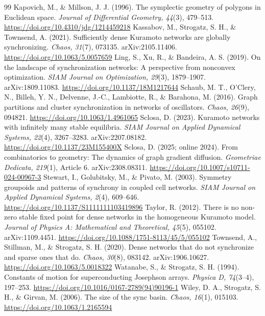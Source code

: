 \documentclass[11pt,a4paper]{article}
\theoremstyle{definition}\newtheorem{conjecture}{Conjecture}
\theoremstyle{remark}\newtheorem{remark}[theorem]{Remark}
\begin{document}
\begin{thebibliography}{99}
 Kapovich, M., \& Millson, J. J. (1996). The symplectic geometry of polygons in Euclidean space. \emph{Journal of Differential Geometry, 44}(3), 479--513. \url{https://doi.org/10.4310/jdg/1214459218}
 Kassabov, M., Strogatz, S. H., \& Townsend, A. (2021). Sufficiently dense Kuramoto networks are globally synchronizing. \emph{Chaos, 31}(7), 073135. arXiv:2105.11406. \url{https://doi.org/10.1063/5.0057659}
 Ling, S., Xu, R., \& Bandeira, A. S. (2019). On the landscape of synchronization networks: A perspective from nonconvex optimization. \emph{SIAM Journal on Optimization, 29}(3), 1879--1907. arXiv:1809.11083. \url{https://doi.org/10.1137/18M1217644}
 Schaub, M. T., O'Clery, N., Billeh, Y. N., Delvenne, J.-C., Lambiotte, R., \& Barahona, M. (2016). Graph partitions and cluster synchronization in networks of oscillators. \emph{Chaos, 26}(9), 094821. \url{https://doi.org/10.1063/1.4961065}
 Sclosa, D. (2023). Kuramoto networks with infinitely many stable equilibria. \emph{SIAM Journal on Applied Dynamical Systems, 22}(4), 3267--3283. arXiv:2207.08182. \url{https://doi.org/10.1137/23M155400X}
 Sclosa, D. (2025; online 2024). From combinatorics to geometry: The dynamics of graph gradient diffusion. \emph{Geometriae Dedicata, 219}(1), Article 6. arXiv:2308.08311. \url{https://doi.org/10.1007/s10711-024-00967-3}
 Stewart, I., Golubitsky, M., \& Pivato, M. (2003). Symmetry groupoids and patterns of synchrony in coupled cell networks. \emph{SIAM Journal on Applied Dynamical Systems, 2}(4), 609--646. \url{https://doi.org/10.1137/S1111111103419896}
 Taylor, R. (2012). There is no non-zero stable fixed point for dense networks in the homogeneous Kuramoto model. \emph{Journal of Physics A: Mathematical and Theoretical, 45}(5), 055102. arXiv:1109.4451. \url{https://doi.org/10.1088/1751-8113/45/5/055102}
 Townsend, A., Stillman, M., \& Strogatz, S. H. (2020). Dense networks that do not synchronize and sparse ones that do. \emph{Chaos, 30}(8), 083142. arXiv:1906.10627. \url{https://doi.org/10.1063/5.0018322}
 Watanabe, S., \& Strogatz, S. H. (1994). Constants of motion for superconducting Josephson arrays. \emph{Physica D, 74}(3--4), 197--253. \url{https://doi.org/10.1016/0167-2789(94)90196-1}
 Wiley, D. A., Strogatz, S. H., \& Girvan, M. (2006). The size of the sync basin. \emph{Chaos, 16}(1), 015103. \url{https://doi.org/10.1063/1.2165594}
\end{thebibliography}
\end{document}
